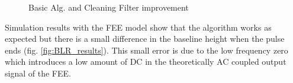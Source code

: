 \documentclass[a4paper,11pt]{report}
\begin{document}
\begin{figure}[!tbp]
  \centering
  \hfill
  \caption{Basic Alg. and Cleaning Filter improvement}
  \label{fig:BLR_ralgo}
\end{figure}



Simulation results with the FEE model show that the algorithm works as expected but there is a small difference in the baseline height when the pulse ends (fig. \ref{fig:BLR_results}). This small error is due to the low frequency zero which introduces a low amount of DC in the theoretically AC coupled output signal of the FEE.
\end{document}
